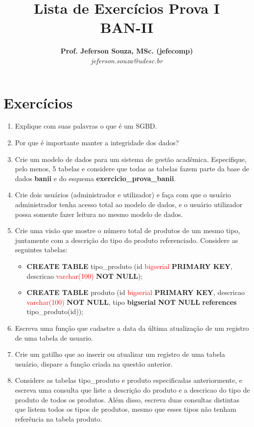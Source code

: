 \documentclass[12pt]{article}
\title{Lista de Exercícios Prova I\\
BAN-II}
\author{\textbf{Prof. Jeferson Souza, MSc. (jefecomp)} \\
\textit{jeferson.souza@udesc.br}
}
\begin{document}
\date{}

\maketitle
\section*{Exercícios}

\begin{enumerate}
\itemsep 10mm

\item Explique com suas palavras o que é um SGBD.

\item Por que é importante manter a integridade dos dados?

\item Crie um modelo de dados para um sistema de gestão acadêmica. Especifique, pelo menos, 5 tabelas e considere que todas as tabelas fazem parte da base de dados \textbf{banii} e do esquema \textbf{exercicio\_prova\_banii}.

\item Crie dois usuários (administrador e utilizador) e faça com que o usuário administrador tenha acesso total ao modelo de dados, e o usuário utilizador possa somente fazer leitura no mesmo modelo de dados.

\item Crie uma visão que mostre o número total de produtos de um mesmo tipo, juntamente com a descrição do tipo do produto referenciado. Considere as seguintes tabelas:

\begin{itemize}

\item \textbf{CREATE TABLE} tipo\_produto (id \textcolor{red}{bigserial} \textbf{PRIMARY KEY}, descricao \textcolor{red}{varchar(100)} \textbf{NOT NULL});

\item \textbf{CREATE TABLE} produto (id \textcolor{red}{bigserial} \textbf{PRIMARY KEY}, descricao \textcolor{red}{varchar(100)} \textbf{NOT NULL}, tipo \textbf{bigserial} \textbf{NOT NULL} \textbf{references} tipo\_produto(id));

\end{itemize}

\item Escreva uma função que cadastre a data da última atualização de um registro de uma tabela de usuario.

\item Crie um gatilho que ao inserir ou atualizar um registro de uma tabela usuário, dispare a função criada na questão anterior. 

\item Considere as tabelas tipo\_produto e produto especificadas anteriormente, e escreva uma consulta que liste a descrição do produto e a descricao do tipo de produto de todos os produtos. Além disso, escreva duas consultas distintas que listem todos os tipos de produtos, mesmo que esses tipos não tenham referência na tabela produto.

\end{enumerate}
\end{document}
